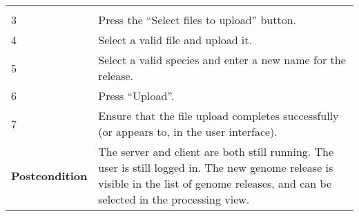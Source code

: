\begin{longtable}[c]{@{}ll@{}}
\begin{minipage}[t]{0.63\columnwidth}
\strut\end{minipage}\tabularnewline
\begin{minipage}[t]{0.31\columnwidth}\raggedright\strut
3
\strut\end{minipage} &
\begin{minipage}[t]{0.63\columnwidth}\raggedright\strut
Press the ``Select files to upload'' button.
\strut\end{minipage}\tabularnewline
\begin{minipage}[t]{0.31\columnwidth}\raggedright\strut
4
\strut\end{minipage} &
\begin{minipage}[t]{0.63\columnwidth}\raggedright\strut
Select a valid file and upload it.
\strut\end{minipage}\tabularnewline
\begin{minipage}[t]{0.31\columnwidth}\raggedright\strut
5
\strut\end{minipage} &
\begin{minipage}[t]{0.63\columnwidth}\raggedright\strut
Select a valid species and enter a new name for the release.
\strut\end{minipage}\tabularnewline
\begin{minipage}[t]{0.31\columnwidth}\raggedright\strut
6
\strut\end{minipage} &
\begin{minipage}[t]{0.63\columnwidth}\raggedright\strut
Press ``Upload''.
\strut\end{minipage}\tabularnewline
\begin{minipage}[t]{0.31\columnwidth}\raggedright\strut
7
\strut\end{minipage} &
\begin{minipage}[t]{0.63\columnwidth}\raggedright\strut
Ensure that the file upload completes successfully (or appears to, in
the user interface).
\strut\end{minipage}\tabularnewline
\begin{minipage}[t]{0.31\columnwidth}\raggedright\strut
\textbf{Postcondition}
\strut\end{minipage} &
\begin{minipage}[t]{0.63\columnwidth}\raggedright\strut
The server and client are both still running. The user is still logged
in. The new genome release is visible in the list of genome releases,
and can be selected in the processing view.
\strut\end{minipage}\tabularnewline
\bottomrule
\end{longtable}

